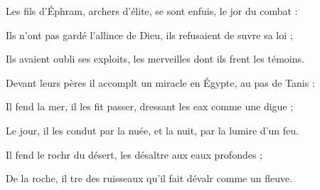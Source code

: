 \item Les fils d’Éphram, archers d’élite,\psstar{} se sont enfuis, le jor du combat :
\item Ils n’ont pas gardé l’allince de Dieu,\psstar{} ils refusaient de suvre sa loi ;
\item Ils avaient oubli ses exploits,\psstar{} les merveilles dont ils frent les témoins.
\item Devant leurs pères il accomplt un miracle\psstar{} en Égypte, au pas de Tanis :
\item Il fend la mer, il les fit passer,\psstar{} dressant les eax comme une digue ;
\item Le jour, il les condut par la nuée,\psstar{} et la nuit, par la lumire d’un feu.
\item Il fend le rochr du désert,\psstar{} les désaltre aux eaux profondes ;
\item De la roche, il tre des ruisseaux\psstar{} qu’il fait dévalr comme un fleuve.